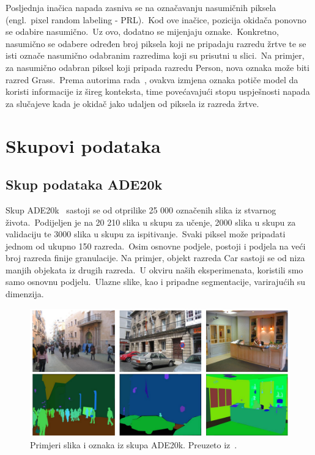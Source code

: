 \documentclass[times, utf8, seminar, numeric]{fer}
\begin{document}
Posljednja inačica napada zasniva se na označavanju nasumičnih piksela (engl.\ pixel random labeling - PRL).\
Kod ove inačice, pozicija okidača ponovno se odabire nasumično.\ Uz ovo, dodatno se mijenjaju oznake.\ 
Konkretno, nasumično se odabere određen broj piksela koji ne pripadaju razredu žrtve te se isti označe nasumično odabranim razredima koji su prisutni u slici.\ 
Na primjer, za nasumično odabran piksel koji pripada razredu Person, nova oznaka može biti razred Grass.\ 
Prema autorima rada~\cite{lan2023influencer}, ovakva izmjena oznaka potiče model da koristi informacije iz šireg konteksta, time povećavajući stopu uspješnosti napada za slučajeve kada je okidač jako udaljen od piksela iz razreda žrtve.\ 

\chapter{Skupovi podataka}

\section{Skup podataka ADE20k}

Skup ADE20k~\cite{zhou2019semantic} sastoji se od otprilike 25 000 označenih slika iz stvarnog života.\ 
Podijeljen je na 20 210 slika u skupu za učenje, 2000 slika u skupu za validaciju te 3000 slika u skupu za ispitivanje.\ Svaki piksel može pripadati jednom od ukupno 150 razreda.\ 
Osim osnovne podjele, postoji i podjela na veći broj razreda finije granulacije. Na primjer, objekt razreda Car sastoji se od niza manjih objekata iz drugih razreda.\ 
U okviru naših eksperimenata, koristili smo samo osnovnu podjelu.\ Ulazne slike, kao i pripadne segmentacije, varirajućih su dimenzija.\ 
  
\begin{figure}[htb]
    \centering
    \includegraphics[scale=1.5]{./Slike/ade20k.png}
    \caption{Primjeri slika i oznaka iz skupa ADE20k. Preuzeto iz~\cite{zhou2019semantic}.}
    \label{fig:ade20k}
\end{figure}
\end{document}
